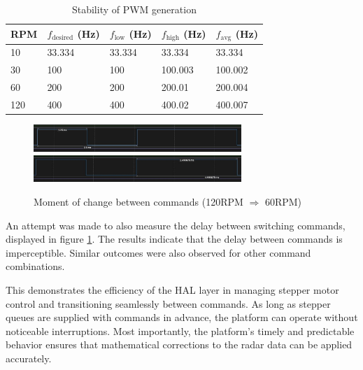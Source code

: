 \begin{table}[h!]
  \centering
  \caption[Stability of PWM generation]{Stability of PWM generation}
  \begin{tabular}{| m{2cm} || m{2.5cm} | m{2.5cm} | m{2.5cm} | m{2.5cm} |}
    \hline
    RPM & $f_{\mathrm{desired}}$ (Hz) & $f_{\mathrm{low}}$ (Hz) & $f_{\mathrm{high}}$ (Hz) & $f_\mathrm{avg}$ (Hz) \\
    \hline
    10  & 33.334                      & 33.334                  & 33.334                   & 33.334                \\
    30  & 100                         & 100                     & 100.003                  & 100.002               \\
    60  & 200                         & 200                     & 200.01                   & 200.004               \\
    120 & 400                         & 400                     & 400.02                   & 400.007               \\
    \hline
  \end{tabular}
  \label{tab:performancepwm}
\end{table}

\begin{figure}[h!]
  \centering
  \includegraphics[width=0.7\textwidth]{../img/120rpm_to60_1.jpg}
  \includegraphics[width=0.7\textwidth]{../img/120rpm_to60_2.jpg}
  \caption[Moment of change between commands with 120RPM and 60RPM]{Moment of change between commands (120RPM $\Rightarrow$  60RPM)}
  \label{fig:switching}
\end{figure}

An attempt was made to also measure the delay  between switching commands, displayed in figure \ref{fig:switching}.
The results indicate that the delay between commands is imperceptible.
Similar outcomes were also observed for other command combinations.

This demonstrates the efficiency of the HAL layer in managing stepper motor control and transitioning seamlessly between commands.
As long as stepper queues are supplied with commands in advance, the platform can operate without noticeable interruptions.
Most importantly, the platform’s timely and predictable behavior ensures that mathematical corrections to the radar data can be applied accurately.



